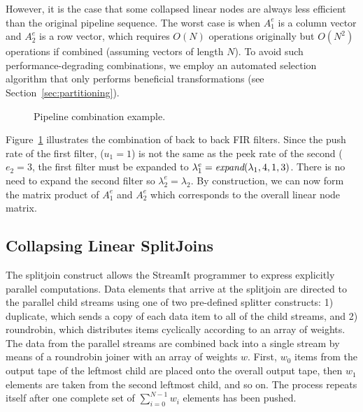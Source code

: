 {However, it is the case that some collapsed linear nodes are always
less efficient than the original pipeline sequence.  The worst case is
when $A_1^e$ is a column vector and $A_2^e$ is a row vector, which
requires $O(N)$ operations originally but $O(N^2)$ operations if
combined (assuming vectors of length $N$).  To avoid such
performance-degrading combinations, we employ an automated selection
algorithm that only performs beneficial transformations (see
Section~\ref{sec:partitioning}).

\begin{figure}[t]
\begin{center}
\end{center}
\vspace{-6pt}
\caption{Pipeline combination example.}
\label{fig:example-pipeline-combination}
\vspace{-12pt}
\end{figure}

Figure~\ref{fig:example-pipeline-combination} illustrates the 
combination of back to back FIR filters. Since
the push rate of the first filter, ($u_1=1$) is not the same as
the peek rate of the second ($e_2=3$, the first filter
must be expanded to $\lambda_1^e = \mbox{\it expand}(\lambda_1,4,1,3)$.
There is no need to expand the second filter so 
$\lambda_2^e = \lambda_2$. By construction, we can now form the
matrix product of $A_1^e$ and $A_2^e$ which corresponds to the
overall linear node matrix.

\subsection{Collapsing Linear SplitJoins}

The splitjoin construct allows the StreamIt programmer to
express explicitly parallel computations.  Data elements that arrive
at the splitjoin are directed to the parallel child streams
using one of two pre-defined splitter constructs: 1) duplicate,
which sends a copy of each data item to all of the child streams, and
2) roundrobin, which distributes items cyclically according to an
array of weights.  The data from the parallel streams are
combined back into a single stream by means of a roundrobin 
joiner with an array of weights $w$.  First, $w_0$ items from the
output tape of the leftmost child are placed onto the overall output
tape, then $w_1$ elements are taken from the second leftmost child,
and so on.  The process repeats itself after one complete set of
$\sum_{i=0}^{N-1} w_i$ elements has been pushed.

}
